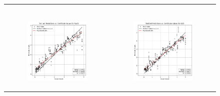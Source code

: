 \begin{figure}
{\begin{tabular}{cc}
\begin{subfigure}{0.5\textwidth}
            \end{subfigure} \\
            \begin{subfigure}{0.5\textwidth}
                \includegraphics[width=\textwidth]{images/one_to_one/elasticnet/Na2O.png}
            \end{subfigure} & \hspace{3cm}
            \begin{subfigure}{0.5\textwidth}
                \includegraphics[width=\textwidth]{images/one_to_one/elasticnet/K2O.png}

\end{subfigure}
\end{tabular}}
\end{figure}
